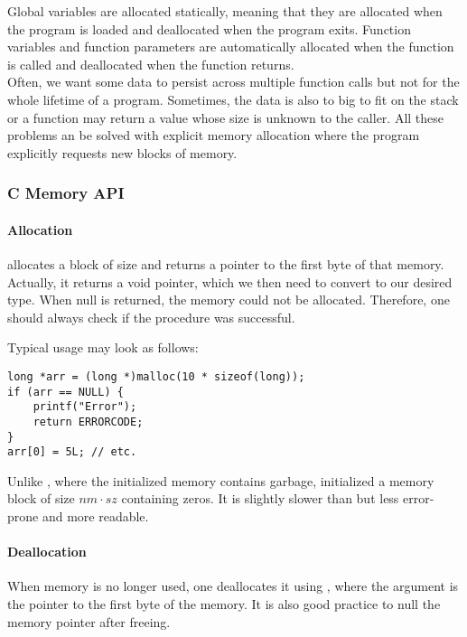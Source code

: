 

Global variables are allocated statically, meaning that they are allocated when the program is loaded and deallocated when the program exits. Function variables and function parameters are automatically allocated when the function is called and deallocated when the function returns.\\
Often, we want some data to persist across multiple function calls but not for the whole lifetime of a program. Sometimes, the data is also to big to fit on the stack or a function may return a value whose size is unknown to the caller. All these problems an be solved with explicit memory allocation where the program explicitly requests new blocks of memory.

\subsubsection{C Memory API}
\paragraph{Allocation}
 allocates a block of size  and returns a pointer to the first byte of that memory. Actually, it returns a void pointer, which we then need to convert to our desired type. When null is returned, the memory could not be allocated. Therefore, one should always check if the procedure was successful. 

Typical usage may look as follows:
\begin{lstlisting}
long *arr = (long *)malloc(10 * sizeof(long));
if (arr == NULL) {
    printf("Error");
    return ERRORCODE;
}
arr[0] = 5L; // etc.
\end{lstlisting}

Unlike , where the initialized memory contains garbage, initialized a memory block of size $nm \cdot sz$ containing zeros. It is slightly slower than  but less error-prone and more readable. %

\paragraph{Deallocation}
When memory is no longer used, one deallocates it using , where the argument is the pointer to the first byte of the memory. It is also good practice to null the memory pointer after freeing.

